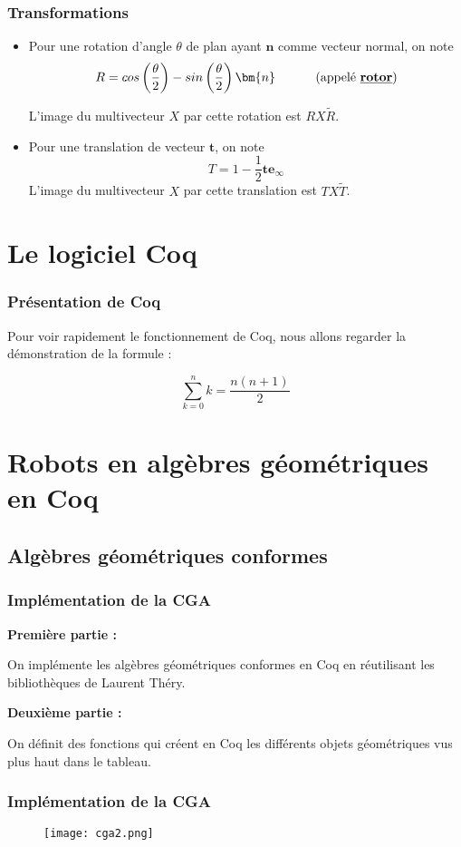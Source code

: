 \documentclass{beamer}
\newcommand{\sg}[1]{\textbf{\underline{#1}}}
\newcommand{\e}[1]{\bm{e_{#1}}}
\newcommand{\ei}{\e{\infty}}
\begin{document}
\begin{frame}
\frametitle{Transformations}
\begin{itemize}
\item Pour une rotation d'angle $\theta$ de plan ayant $\bm{n}$ comme vecteur normal, on note $$R = cos\left(\frac{\theta}{2}\right)- sin\left(\frac{\theta}{2}\right) \bm{n} \text{\hspace*{1cm} (appelé \sg{rotor})}$$ 

L'image du multivecteur $X$ par cette rotation est $RX\tilde{R}$.\pause
\item Pour une translation de vecteur $\bm{t}$, on note $$T = 1-\frac{1}{2} \bm{t} \ei $$ L'image du multivecteur $X$ par cette translation est $TX\tilde{T}$.
\end{itemize}
\end{frame}

\section{Le logiciel Coq}

\begin{frame}
\frametitle{Présentation de Coq}
Pour voir rapidement le fonctionnement de Coq, nous allons regarder la démonstration de la formule : 

$$\sum_{k=0}^n k = \frac{n(n+1)}{2}$$
\end{frame}

\section{Robots en algèbres géométriques en Coq}
\subsection{Algèbres géométriques conformes}
\begin{frame}
\frametitle{Implémentation de la CGA}
\pause

\textbf{Première partie :} 

On implémente les algèbres géométriques conformes en Coq en réutilisant les bibliothèques de Laurent Théry.\bigskip
\pause

\textbf{Deuxième partie :} 

On définit des fonctions qui créent en Coq les différents objets géométriques vus plus haut dans le tableau.\bigskip

\end{frame}

\begin{frame}
\frametitle{Implémentation de la CGA}
\vspace{-0.8cm}
\begin{figure}[!ht]
\hspace*{-1.1cm}
\texttt{[image: cga2.png]}
\end{figure}
\end{frame}
\end{document}
